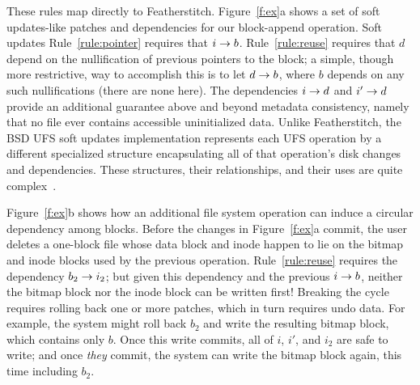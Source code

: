 \documentclass[9pt,twocolumn,letterpaper]{article}
\newcommand{\Kudos}{Featherstitch}
\newcommand{\Featherstitch}{\Kudos}
\newcommand{\patch}{patch}
\newcommand{\patches}{patches}
\begin{document}
These rules map directly to \Featherstitch.
%
Figure~\ref{f:ex}a shows a set of soft updates-like patches and dependencies for
 our block-append operation.
%
%
%
%
Soft updates Rule~\ref{rule:pointer} requires that $i \rightarrow b$.
%
Rule~\ref{rule:reuse} requires that $d$ depend on the nullification of previous pointers to the
 block;
%
a simple, though more restrictive, way to accomplish this is to let $d
 \rightarrow b$, where $b$ depends on any such nullifications
 (there are none here).
%
The dependencies $i \rightarrow d$ and $i' \rightarrow d$ provide an
 additional guarantee above and beyond metadata consistency, namely
 that no file ever contains accessible uninitialized data.
%
%
Unlike \Featherstitch, the BSD UFS soft updates implementation represents each UFS
 operation by a different specialized structure encapsulating
 all of that operation's disk changes and dependencies.
These structures, their
relationships, and their uses %
are quite complex~\cite{mckusick99soft}.

\begin{comment}
\begin{figure}[htb]
  \centering
  \texttt{[image: fig/examplesb\_3]}
  \caption{\label{fig:softupdate} Soft updates \patches\
  for appending one block to an empty file in an FFS-like file system.}
\end{figure}
\end{comment}

Figure~\ref{f:ex}b shows how an additional file system operation can induce
 a circular dependency among blocks.
%
Before the changes in Figure~\ref{f:ex}a commit, the user deletes a
 one-block file whose data block and inode happen to lie on the bitmap
 and inode blocks used by the previous operation.
%
Rule~\ref{rule:reuse} requires the dependency $b_2 \rightarrow i_2$; but
 given this dependency and the previous $i \rightarrow b$, neither the bitmap
 block nor the inode block can be written first!
%
Breaking the cycle requires rolling back one or more patches, which in turn
 requires undo data.
%
For example, the system might roll back $b_2$ and write the resulting
 bitmap block, which contains only
 $b$.  Once this write commits, all of $i$, $i'$, and
 $i_2$ are safe to write; and once \emph{they} commit, the system can write
 the bitmap block again, this time including $b_2$.
\end{document}
